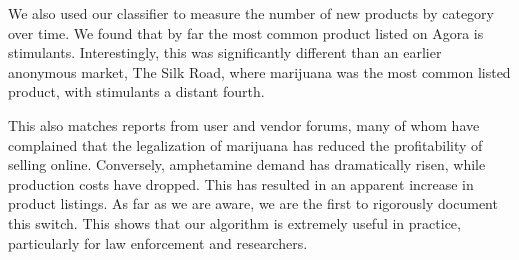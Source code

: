 We also used our classifier to measure the number of new products by category over time.
We found that by far the most common product listed on Agora is stimulants.
Interestingly, this was significantly different than an earlier anonymous market, The Silk Road,
where marijuana was the most common listed product, with stimulants a distant fourth\cite{christin-silkroad}.

This also matches reports from user and vendor forums, many of whom have complained that the
legalization of marijuana has reduced the profitability of selling online.
Conversely, amphetamine demand has dramatically risen, while production costs have dropped.
This has resulted in an apparent increase in product listings.
As far as we are aware, we are the first to rigorously document this switch.
This shows that our algorithm is extremely useful in practice, particularly for law enforcement and researchers.

